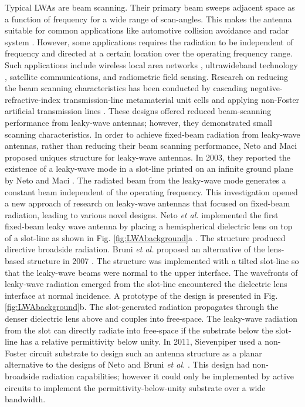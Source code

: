Typical LWAs are beam scanning. Their primary beam sweeps adjacent space as a function of frequency for a wide range of scan-angles. This makes the antenna suitable for common applications like automotive collision avoidance \cite{Ettorre2010} \cite{Wollitzer1998} and radar system \cite{Yang2013}. However, some applications requires the radiation to be independent of frequency and directed at a certain location over the operating frequency range. Such applications include wireless local area networks \cite{Arslan2006}, ultrawideband technology \cite{Begaud2013}, satellite communications, and radiometric field sensing. Research on reducing the beam scanning characteristics has been conducted by cascading negative-refractive-index transmission-line metamaterial unit cells \cite{Antoniades2008} and applying non-Foster artificial transmission lines \cite{mirzaei2011}. These designs offered reduced beam-scanning performance from leaky-wave antennas; however, they demonstrated small scanning characteristics. In order to achieve fixed-beam radiation from leaky-wave antennas, rather than reducing their beam scanning performance, Neto and Maci proposed uniques structure for leaky-wave antennas. In 2003, they reported the existence of a leaky-wave mode in a slot-line printed on an infinite ground plane by Neto and Maci \cite{Neto2003, Maci2004}. The radiated beam from the leaky-wave mode generates a constant beam independent of the operating frequency. This investigation opened a new approach of research on leaky-wave antennas that focused on fixed-beam radiation, leading to various novel designs.  Neto \textit{et al.} implemented the first fixed-beam leaky wave antenna by placing a hemispherical dielectric lens on top of a slot-line as shown in Fig. \ref{fig:LWAbackground}a \cite{Neto2005}. The structure produced directive broadside radiation. Bruni \textit{et al.} proposed an alternative of the lens-based structure in 2007 \cite{Bruni2007}. The structure was implemented with a tilted slot-line so that the leaky-wave beams were normal to the upper interface. The wavefronts of leaky-wave radiation emerged from the slot-line encountered the dielectric lens interface at normal incidence. A prototype of the design is presented in Fig. \ref{fig:LWAbackground}b. The slot-generated radiation propagates through the denser dielectric lens above and couples into free-space. The leaky-wave radiation from the slot can directly radiate into free-space if the substrate below the slot-line has a relative permittivity below unity. In 2011, Sievenpiper used a non-Foster circuit substrate to design such an antenna structure as a planar alternative to the designs of Neto and Bruni \textit{et al.} \cite{Sievenpiper2011}. This design had non-broadside radiation capabilities; however it could only be implemented by active circuits to implement the permittivity-below-unity substrate over a wide bandwidth. 

